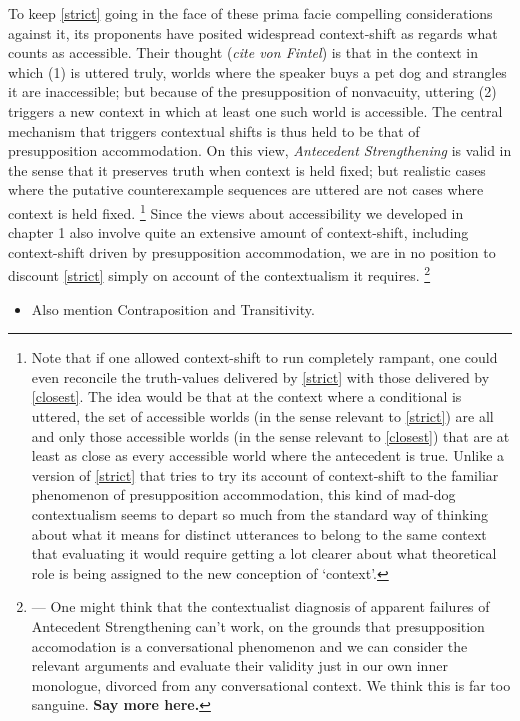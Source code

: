 \documentclass[leqno, 11pt, a5paper, openany]{article}
\begin{document}
To keep \ref{strict} going in the face of these prima facie compelling considerations against it, its proponents have posited widespread context-shift as regards what counts as accessible. Their thought (\emph{cite von Fintel}) is that in the context in which (1) is uttered truly, worlds where the speaker buys a pet dog and strangles it are inaccessible; but because of the presupposition of nonvacuity, uttering (2) triggers a new context in which at least one such world is accessible. The central mechanism that triggers contextual shifts is thus held to be that of presupposition accommodation. On this view, \emph{Antecedent Strengthening} is valid in the sense that it preserves truth when context is held fixed; but realistic cases where the putative counterexample sequences are uttered are not cases where context is held fixed.%
\footnote{Note that if one allowed context-shift to run completely rampant, one could even reconcile the truth-values delivered by \ref{strict} with those delivered by \ref{closest}. The idea would be that at the context where a conditional is uttered, the set of accessible worlds (in the sense relevant to \ref{strict}) are all and only those accessible worlds (in the sense relevant to \ref{closest}) that are at least as close as every accessible world where the antecedent is true. Unlike a version of \ref{strict} that tries to try its account of context-shift to the familiar phenomenon of presupposition accommodation, this kind of mad-dog contextualism seems to depart so much from the standard way of thinking about what it means for distinct utterances to belong to the same context that evaluating it would require getting a lot clearer about what theoretical role is being assigned to the new conception of ‘context’.} 
Since the views about accessibility we developed in chapter 1 also involve quite an extensive amount of context-shift, including context-shift driven by presupposition accommodation, we are in no position to discount \ref{strict} simply on account of the contextualism it requires.%
\footnote{--- One might think that the contextualist diagnosis of apparent failures of Antecedent Strengthening can't work, on the grounds that presupposition accomodation is a conversational phenomenon and we can consider the relevant arguments and evaluate their validity just in our own inner monologue, divorced from any conversational context. We think this is far too sanguine. \textbf{Say more here.}}

\begin{itemize}
\item
  Also mention Contraposition and Transitivity.
\end{itemize}
\end{document}
